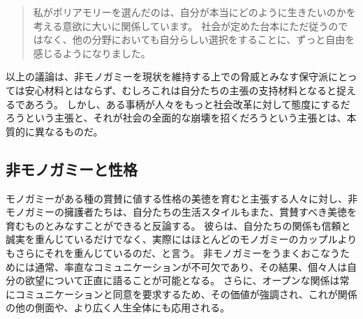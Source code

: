 \documentclass[paper=a4,book,openany]{jlreq}
\begin{document}
\begin{quote}
  私がポリアモリーを選んだのは、自分が本当にどのように生きたいのかを考える意欲に大いに関係しています。
社会が定めた台本にただ従うのではなく、他の分野においても自分らしい選択をすることに、ずっと自由を感じるようになりました。
\citep[pp.9--10]{sheff05:_polyam_women_sexual_subjec_power}

\end{quote}

以上の議論は、非モノガミーを現状を維持する上での脅威とみなす保守派にとっては安心材料とはならず、むしろこれは自分たちの主張の支持材料となると捉えるであろう。
しかし、ある事柄が人々をもっと社会改革に対して態度にするだろうという主張と、それが社会の全面的な崩壊を招くだろうという主張とは、本質的に異なるものだ。

\subsection{非モノガミーと性格}

モノガミーがある種の賞賛に値する性格の美徳を育むと主張する人々に対し、非モノガミーの擁護者たちは、自分たちの生活スタイルもまた、賞賛すべき美徳を育むものとみなすことができると反論する。
彼らは、自分たちの関係も信頼と誠実を重んじているだけでなく、実際にはほとんどのモノガミーのカップルよりもさらにそれを重んじているのだ、と言う。
非モノガミーをうまくおこなうためには通常、率直なコミュニケーションが不可欠であり、その結果、個々人は自分の欲望について正直に語ることが可能となる。
さらに、オープンな関係は常にコミュニケーションと同意を要求するため、その価値が強調され、これが関係の他の側面や、より広く人生全体にも応用される。
\end{document}
